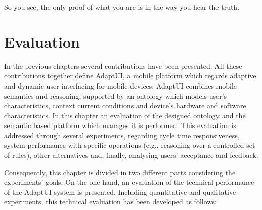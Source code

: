 \begin{savequote}[50mm]
So you see, the only proof of what you are is in the way you hear the truth.
\end{savequote}

\ifpdf
\graphicspath{{5_experiments_and_results/figures/PNG/}
{5_experiments_and_results/figures/PDF/}{5_experiments_and_results/figures/}}
\fi

\chapter{Evaluation}
\label{cha:evaluation}


In the previous chapters several contributions have been presented. All these
contributions together define AdaptUI, a mobile platform which regards adaptive 
and dynamic user interfacing for mobile devices. AdaptUI combines mobile 
semantics and reasoning, supported by an ontology which models user's 
characteristics, context current conditions and device's hardware and software 
characteristics. In this chapter an evaluation of the designed ontology and the 
semantic based platform which manages it is performed. This evaluation is 
addressed through several experiments, regarding cycle time responsiveness, 
system performance with specific operations (e.g., reasoning over a controlled 
set of rules), other alternatives and, finally, analysing users' acceptance and 
feedback.

Consequently, this chapter is divided in two different parts considering the 
experiments' goals. On the one hand, an evaluation of the technical performance
of the AdaptUI system is presented. Including quantitative and qualitative 
experiments, this technical evaluation has been developed as follows:

